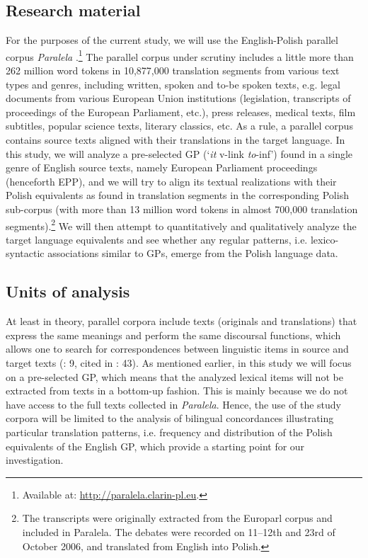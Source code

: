 \documentclass[output=paper]{langscibook}
\begin{document}
\subsection{Research material}

For the purposes of the current study, we will use the English-Polish parallel corpus \textit{Paralela} \citep{Pęzik2016}.\footnote{Available at: \url{http://paralela.clarin-pl.eu}.} The parallel corpus under scrutiny includes a little more than 262 million word tokens in 10,877,000 translation segments from various text types and genres, including written, spoken and to-be spoken texts, e.g. legal documents from various European Union institutions (legislation, transcripts of proceedings of the European Parliament, etc.), press releases, medical texts, film subtitles, popular science texts, literary classics, etc. As a rule, a parallel corpus contains source texts aligned with their translations in the target language. In this study, we will analyze a pre-selected GP (‘\textit{it} v-link {\ADJ} \textit{to}{}-inf’) found in a single genre of English source texts, namely European Parliament proceedings (henceforth EPP), and we will try to align its textual realizations with their Polish equivalents as found in translation segments in the corresponding Polish sub-corpus (with more than 13 million word tokens in almost 700,000 translation segments).\footnote{The transcripts were originally extracted from the Europarl corpus \citep{Koehn2005} and included in Paralela. The debates were recorded on 11--12th and 23rd of October 2006, and translated from English into Polish.} We will then attempt to quantitatively and qualitatively analyze the target language equivalents and see whether any regular patterns, i.e. lexico-syntactic associations similar to GPs, emerge from the Polish language data.

\subsection{Units of analysis}

At least in theory, parallel corpora include texts (originals and translations) that express the same meanings and perform the same discoursal functions, which allows one to search for correspondences between linguistic items in source and target texts (\citealt{Johansson2007}: 9, cited in \citealt{Marco2019}: 43). As mentioned earlier, in this study we will focus on a pre-selected GP, which means that the analyzed lexical items will not be extracted from texts in a bottom-up fashion. This is mainly because we do not have access to the full texts collected in \textit{Paralela}. Hence, the use of the study corpora will be limited to the analysis of bilingual concordances illustrating particular translation patterns, i.e. frequency and distribution of the Polish equivalents of the English GP, which provide a starting point for our investigation. 
\end{document}

